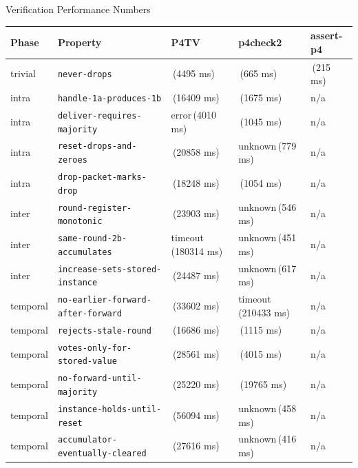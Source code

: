 \newcommand{\rgood}[1]{\textcolor{palOlivine!65!black}{\ding{51}}\,{\tiny#1}}
\newcommand{\rbad}[1]{\textcolor{palCoral}{\ding{55}}\,{\tiny#1}}
\newcommand{\rto}[1]{\textcolor{palCoral}{timeout}\,{\tiny#1}}
\newcommand{\rerr}[1]{\textcolor{palCoral}{error}\,{\tiny#1}}
\newcommand{\runk}[1]{\textcolor{palGray}{unknown}\,{\tiny#1}}
\newcommand{\rna}{\textcolor{palGray}{n/a}}
\begin{frame}{Verification Performance Numbers}
  \centering
  \scriptsize
  \setlength{\tabcolsep}{4.5pt}
  \renewcommand{\arraystretch}{1.18}



  \begin{tabular}{@{}l l l l l@{}}
    \toprule
    \textbf{Phase} & \textbf{Property} & \textbf{P4TV} & \textbf{p4check2} & \textbf{assert-p4} \\
    \midrule
    trivial  & \texttt{never-drops}                       & \rgood{(4495 ms)}    & \rgood{(665 ms)}    & \rgood{(215 ms)} \\
    \addlinespace[2pt]
    intra    & \texttt{handle-1a-produces-1b}               & \rgood{(16409 ms)}   & \rgood{(1675 ms)}   & \rna \\
    intra    & \texttt{deliver-requires-majority}           & \rerr{(4010 ms)}     & \rgood{(1045 ms)}   & \rna \\
    intra    & \texttt{reset-drops-and-zeroes}              & \rgood{(20858 ms)}   & \runk{(779 ms)}     & \rna \\
    intra    & \texttt{drop-packet-marks-drop}              & \rgood{(18248 ms)}   & \rgood{(1054 ms)}   & \rna \\
    \addlinespace[2pt]
    inter    & \texttt{round-register-monotonic}            & \rgood{(23903 ms)}   & \runk{(546 ms)}     & \rna \\
    inter    & \texttt{same-round-2b-accumulates}           & \rto{(180314 ms)}    & \runk{(451 ms)}     & \rna \\
    inter    & \texttt{increase-sets-stored-instance}       & \rgood{(24487 ms)}   & \runk{(617 ms)}     & \rna \\
    \addlinespace[2pt]
    temporal & \texttt{no-earlier-forward-after-forward} & \rgood{(33602 ms)}   & \rto{(210433 ms)}   & \rna \\
    temporal & \texttt{rejects-stale-round}              & \rgood{(16686 ms)}   & \rgood{(1115 ms)}   & \rna \\
    temporal & \texttt{votes-only-for-stored-value}      & \rgood{(28561 ms)}   & \rgood{(4015 ms)}   & \rna \\
    temporal & \texttt{no-forward-until-majority}        & \rgood{(25220 ms)}   & \rgood{(19765 ms)}  & \rna \\
    temporal & \texttt{instance-holds-until-reset}       & \rgood{(56094 ms)}   & \runk{(458 ms)}     & \rna \\
    temporal & \texttt{accumulator-eventually-cleared}   & \rbad{(27616 ms)}    & \runk{(416 ms)}     & \rna \\
    \bottomrule
  \end{tabular}


\end{frame}

